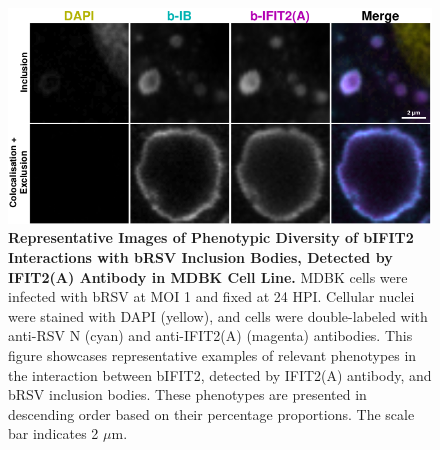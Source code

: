 \begin{figure}
    \centering
    \includegraphics[width=1\linewidth]{08. Chapter 3/Figs/02. Infection/02. IFIT2/01. IFIT2A/15. i2a mdbk brsv.pdf} 
    \caption[Representative Images of Phenotypic Diversity of bIFIT2 Interactions with bRSV Inclusion Bodies, Detected by IFIT2(A) Antibody in MDBK Cell Line.]{\textbf{Representative Images of Phenotypic Diversity of bIFIT2 Interactions with bRSV Inclusion Bodies, Detected by IFIT2(A) Antibody in MDBK Cell Line.} MDBK cells were infected with bRSV at MOI 1 and fixed at 24 HPI. Cellular nuclei were stained with DAPI (yellow), and cells were double-labeled with anti-RSV N (cyan) and anti-IFIT2(A) (magenta) antibodies. This figure showcases representative examples of relevant phenotypes in the interaction between bIFIT2, detected by IFIT2(A) antibody, and bRSV inclusion bodies. These phenotypes are presented in descending order based on their percentage proportions. The scale bar indicates 2 \(\mu \mbox{m}\).}
    \label{fig:Representative Images of Phenotypic Diversity of bIFIT2 Interactions with bRSV Inclusion Bodies, Detected by IFIT2(A) Antibody in MDBK Cell Line}
\end{figure}

